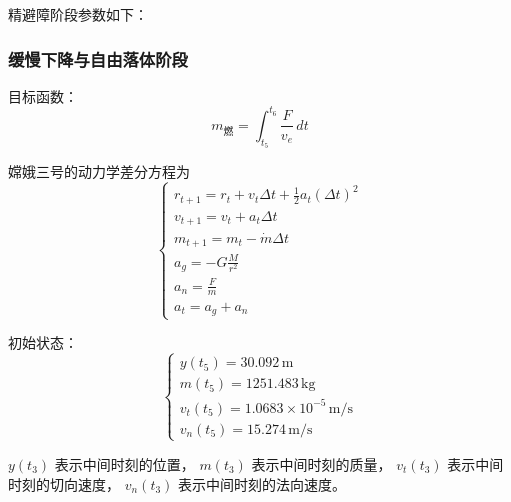 \documentclass{ctexart}
\begin{document}
精避障阶段参数如下：
\begin{center}
\end{center}
\subsubsection{缓慢下降与自由落体阶段}

目标函数：
\begin{equation}
m_{\text{燃}} = \int_{t_5}^{t_6} \frac{F}{v_e} \, dt
\end{equation}

嫦娥三号的动力学差分方程为
\[
\begin{cases}
r_{t+1} = r_t + v_t \Delta t + \frac{1}{2} a_t (\Delta t)^2 \\
v_{t+1} = v_t + a_t \Delta t \\
m_{t+1} = m_t - \dot{m} \Delta t \\
a_g = - G \frac{M}{r^2} \\
a_n = \frac{F}{m} \\
a_t = a_g + a_n
\end{cases}
\]

初始状态：
\begin{equation}
\begin{cases}
y(t_5) = 30.092 \, \text{m} \\
m(t_5) = 1251.483 \, \text{kg} \\
v_t(t_5) = 1.0683\times 10^{-5} \, \text{m/s} \\
v_n(t_5) = 15.274 \, \text{m/s}
\end{cases}
\end{equation}


$y(t_3)$ 表示中间时刻的位置，
$m(t_3)$ 表示中间时刻的质量，
$v_t(t_3)$ 表示中间时刻的切向速度，
$v_n(t_3)$ 表示中间时刻的法向速度。
\end{document}
